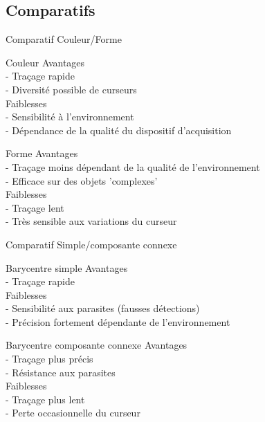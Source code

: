 \documentclass{beamer}
\begin{document}
		\subsection{Comparatifs}
		\begin{frame}{Comparatif Couleur/Forme}
		\pause
			\begin{block}{Couleur}
				Avantages \\
				- Traçage rapide \\
				- Diversité possible de curseurs \\
				Faiblesses \\
				- Sensibilité à l'environnement\\
				- Dépendance de la qualité du dispositif d'acquisition\\
			\end{block}
			\pause
			\begin{block}{Forme}
				Avantages \\
				- Traçage moins dépendant de la qualité de l'environnement \\
				- Efficace sur des objets 'complexes'\\
				Faiblesses \\
				- Traçage lent \\
				- Très sensible aux variations du curseur\\
			\end{block}
		\end{frame}
		\begin{frame}{Comparatif Simple/composante connexe}
		\pause
			\begin{block}{Barycentre simple}
				Avantages \\
				- Traçage rapide \\
				Faiblesses \\
				- Sensibilité aux parasites (fausses détections)\\
				- Précision fortement dépendante de l'environnement\\
			\end{block}
			\pause
			\begin{block}{Barycentre composante connexe}
				Avantages \\
				- Traçage plus précis \\
				- Résistance aux parasites \\
				Faiblesses \\
				- Traçage plus lent \\
				- Perte occasionnelle du curseur
			\end{block}
		\end{frame}
\end{document}
